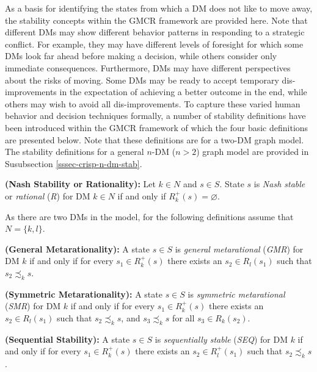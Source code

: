 As a basis for identifying the states from which a DM does not like to move away, the stability concepts within the GMCR framework are provided here. Note that different DMs may show different behavior patterns in responding to a strategic conflict. For example, they may have different levels of foresight for which some DMs look far ahead before making a decision, while others consider only immediate consequences. Furthermore, DMs may have different perspectives about the risks of moving. Some DMs may be ready to accept temporary dis-improvements in the expectation of achieving a better outcome in the end, while others may wish to avoid all dis-improvements. To capture these varied human behavior and decision techniques formally, a number of stability definitions have been introduced within the GMCR framework of which the four basic definitions are presented below. Note that these definitions are for a two-DM graph model. The stability definitions for a general $n$-DM ($n>2$) graph model are provided in Susubsection \ref{sssec-crisp-n-dm-stab}.

\begin{definition}
\rm {\bf (Nash Stability or Rationality):} Let $k \in N$ and $s \in S$. State $s$ is \emph{Nash stable} or \emph{rational} (\emph{R}) for DM $k \in N$ if and only if $R_k^+(s)=\varnothing$.
\end{definition}

As there are two DMs in the model, for the following definitions assume that $N=\{k, l\}$.

\begin{definition}
\rm {\bf (General Metarationality):} A state $s \in S$ is \emph{general metarational} (\emph{GMR}) for DM $k$ if and only if for every $s_1 \in R_k^+(s)$ there exists an $s_2 \in R_l(s_1)$ such that $s_2 \precsim_k s$.
\end{definition}

\begin{definition}
\rm {\bf (Symmetric Metarationality):} A state $s \in S$ is \emph{symmetric metarational} (\emph{SMR}) for DM $k$ if and only if for every $s_1 \in R_k^+(s)$ there exists an $s_2 \in R_l(s_1)$ such that $s_2 \precsim_k s$, and $s_3 \precsim_k s$ for all $s_3 \in R_k(s_2)$.
\end{definition}

\begin{definition}
\rm {\bf (Sequential Stability):} A state $s \in S$ is \emph{sequentially stable} (\emph{SEQ}) for DM $k$ if and only if for every $s_1 \in R_k^+(s)$ there exists an $s_2 \in R_l^+(s_1)$ such that $s_2 \precsim_k s$.
\end{definition}

